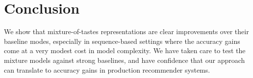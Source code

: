\documentclass[sigchi]{acmart}
\begin{document}
\section{Conclusion}
We show that mixture-of-tastes representations are clear improvements over their baseline modes, especially in sequence-based settings where the accuracy gains come at a very modest cost in model complexity. We have taken care to test the mixture models against strong baselines, and have confidence that our approach can translate to accuracy gains in production recommender systems.




\end{document}

